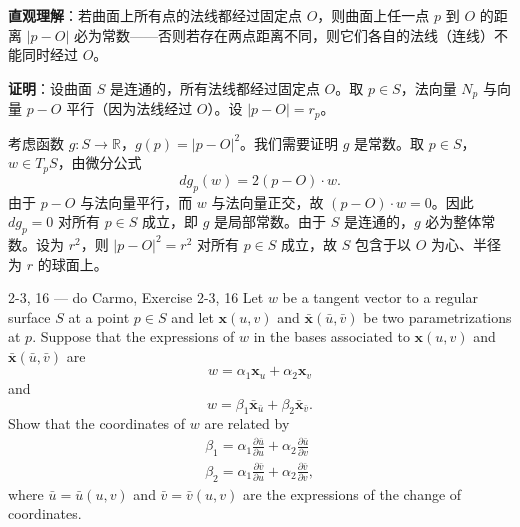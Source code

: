 \begin{solution}
\textbf{直观理解}：若曲面上所有点的法线都经过固定点 $O$，则曲面上任一点 $p$ 到 $O$ 的距离 $|p - O|$ 必为常数——否则若存在两点距离不同，则它们各自的法线（连线）不能同时经过 $O$。

\textbf{证明}：设曲面 $S$ 是连通的，所有法线都经过固定点 $O$。取 $p \in S$，法向量 $N_p$ 与向量 $p - O$ 平行（因为法线经过 $O$）。设 $|p - O| = r_p$。

考虑函数 $g: S \to \mathbb{R}$，$g(p) = |p - O|^2$。我们需要证明 $g$ 是常数。取 $p \in S$，$w \in T_pS$，由微分公式
\[
dg_p(w) = 2(p - O) \cdot w.
\]
由于 $p - O$ 与法向量平行，而 $w$ 与法向量正交，故 $(p - O) \cdot w = 0$。因此 $dg_p = 0$ 对所有 $p \in S$ 成立，即 $g$ 是局部常数。由于 $S$ 是连通的，$g$ 必为整体常数。设为 $r^2$，则 $|p - O|^2 = r^2$ 对所有 $p \in S$ 成立，故 $S$ 包含于以 $O$ 为心、半径为 $r$ 的球面上。
\end{solution}

\begin{exercise}{2-3, 16 — do Carmo, Exercise 2-3, 16}
Let $w$ be a tangent vector to a regular surface $S$ at a point $p \in S$ and let $\mathbf{x}(u, v)$ and $\bar{\mathbf{x}}(\bar{u}, \bar{v})$ be two parametrizations at $p$. Suppose that the expressions of $w$ in the bases associated to $\mathbf{x}(u, v)$ and $\bar{\mathbf{x}}(\bar{u}, \bar{v})$ are
\[
w = \alpha_1 \mathbf{x}_u + \alpha_2 \mathbf{x}_v
\]
and
\[
w = \beta_1 \bar{\mathbf{x}}_{\bar{u}} + \beta_2 \bar{\mathbf{x}}_{\bar{v}}.
\]
Show that the coordinates of $w$ are related by
\[
\begin{array}{l} \beta_1 = \alpha_1 \frac{\partial \bar{u}}{\partial u} + \alpha_2 \frac{\partial \bar{u}}{\partial v} \\ \beta_2 = \alpha_1 \frac{\partial \bar{v}}{\partial u} + \alpha_2 \frac{\partial \bar{v}}{\partial v}, \end{array}
\]
where $\bar{u} = \bar{u}(u, v)$ and $\bar{v} = \bar{v}(u, v)$ are the expressions of the change of coordinates.
\end{exercise}

